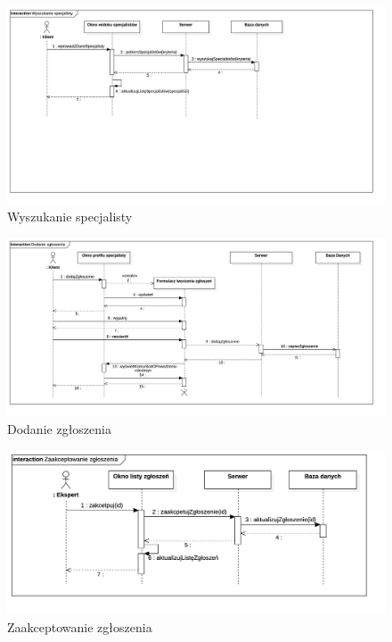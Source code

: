 \documentclass[10pt, titlepage, oneside, a4paper]{article}
\begin{document}
	\begin{figure}[!htbp]
		\centering
		\includegraphics[width=\textwidth{}]{Wyszukanie_specjalisty.png}
		\caption{Wyszukanie specjalisty}
		\label{fig:sequenceDiagramSearchForExpert}
	\end{figure}

	\begin{figure}[!htbp]
		\centering
		\includegraphics[width=\textwidth{}]{Dodanie_zgloszenia.png}
		\caption{Dodanie zgłoszenia}
		\label{fig:sequenceDiagramAddRequest}
	\end{figure}

	\begin{figure}[!htbp]
		\centering
		\includegraphics[width=\textwidth{}]{Zaakceptowanie_zgloszenia.png}
		\caption{Zaakceptowanie zgłoszenia}
		\label{fig:sequenceDiagramAcceptRequest}
	\end{figure}
\end{document}
